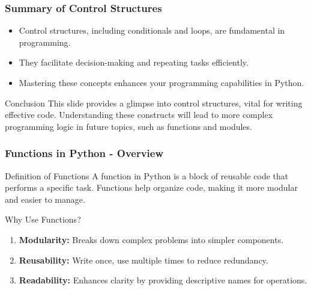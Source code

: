 \documentclass{beamer}
\begin{document}
\begin{frame}
    \frametitle{Summary of Control Structures}
    
    \begin{itemize}
        \item Control structures, including conditionals and loops, are fundamental in programming.
        \item They facilitate decision-making and repeating tasks efficiently.
        \item Mastering these concepts enhances your programming capabilities in Python.
    \end{itemize}
    
    \begin{block}{Conclusion}
        This slide provides a glimpse into control structures, vital for writing effective code. Understanding these constructs will lead to more complex programming logic in future topics, such as functions and modules.
    \end{block}
\end{frame}

\begin{frame}
    \frametitle{Functions in Python - Overview}
    \begin{block}{Definition of Functions}
        A function in Python is a block of reusable code that performs a specific task. Functions help organize code, making it more modular and easier to manage.
    \end{block}
    
    \begin{block}{Why Use Functions?}
        \begin{enumerate}
            \item \textbf{Modularity:} Breaks down complex problems into simpler components.
            \item \textbf{Reusability:} Write once, use multiple times to reduce redundancy.
            \item \textbf{Readability:} Enhances clarity by providing descriptive names for operations.
        \end{enumerate}
    \end{block}
\end{frame}
\end{document}
